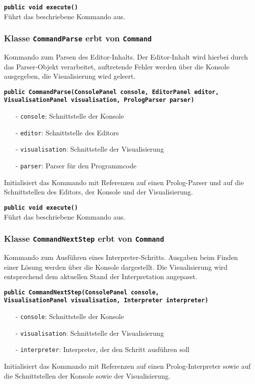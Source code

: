 \documentclass[parskip=full,11pt,twoside]{scrartcl}
\begin{document}
\textbf{\texttt{public void execute()}}\\
Führt das beschriebene Kommando aus.

\subsubsection{Klasse \texttt{CommandParse} erbt von \texttt{Command}}

Kommando zum Parsen des Editor-Inhalts. Der Editor-Inhalt wird hierbei durch das Parser-Objekt verarbeitet, auftretende Fehler werden über die Konsole ausgegeben, die Visualisierung wird geleert.

\textbf{\texttt{public CommandParse(ConsolePanel console, EditorPanel editor,\\VisualisationPanel visualisation, PrologParser parser)}}
\begin{itemize}[noitemsep]
	\item[-] \texttt{console}: Schnittstelle der Konsole
	\item[-] \texttt{editor}: Schnittstelle des Editors
	\item[-] \texttt{visualisation}: Schnittstelle der Visualisierung
	\item[-] \texttt{parser}: Parser für den Programmcode
\end{itemize}
Initialisiert das Kommando mit Referenzen auf einen Prolog-Parser und auf die Schnittstellen des Editors, der Konsole und der Visualisierung.

\textbf{\texttt{public void execute()}}\\
Führt das beschriebene Kommando aus.

\subsubsection{Klasse \texttt{CommandNextStep} erbt von \texttt{Command}}

Kommando zum Ausführen eines Interpreter-Schritts. Ausgaben beim Finden einer Lösung werden über die Konsole dargestellt. Die Visualisierung wird entsprechend dem aktuellen Stand der Interpretation angepasst.

\textbf{\texttt{public CommandNextStep(ConsolePanel console,\\VisualisationPanel visualisation, Interpreter interpreter)}}
\begin{itemize}[noitemsep]
	\item[-] \texttt{console}: Schnittstelle der Konsole
	\item[-] \texttt{visualisation}: Schnittstelle der Visualisierung
	\item[-] \texttt{interpreter}: Interpreter, der den Schritt ausführen soll
\end{itemize}
Initialisiert das Kommando mit Referenzen auf einen Prolog-Interpreter sowie auf die Schnittstellen der Konsole sowie der Visualisierung.
\end{document}
